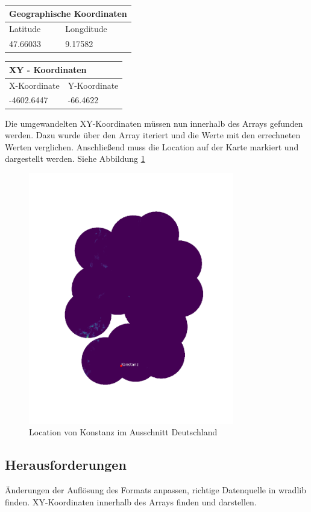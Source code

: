 \begin{table}[H]
\begin{tabularx}{8cm}{|X|X|}
\hline
\multicolumn{2}{|l|}{ Geographische Koordinaten}   \\ \hline
         Latitude  & Longditude         \\ \hline
           47.66033 & 9.17582            \\ \hline
\end{tabularx} 	
\end{table}

\begin{table}[H]
\begin{tabularx}{8cm}{|X|X|}
\hline
\multicolumn{2}{|l|}{ XY - Koordinaten}   \\ \hline
        X-Koordinate & Y-Koordinate         \\ \hline
           -4602.6447 & -66.4622            \\ \hline
\end{tabularx} 	
\end{table}

Die umgewandelten XY-Koordinaten müssen nun innerhalb des Arrays gefunden werden. Dazu wurde über den Array iteriert und die Werte mit den errechneten Werten verglichen. Anschließend muss die Location auf der Karte markiert und dargestellt werden. Siehe Abbildung \ref{location}

\begin{figure}[H]
	\centering
	\includegraphics[width=0.8\textwidth]{pics/Location.png}
	\caption{Location von Konstanz im Ausschnitt Deutschland}
	\label{location}
\end{figure}

\subsection{Herausforderungen} 
Änderungen der Auflösung des Formats anpassen, richtige Datenquelle in wradlib finden. XY-Koordinaten innerhalb des Arrays finden und darstellen.